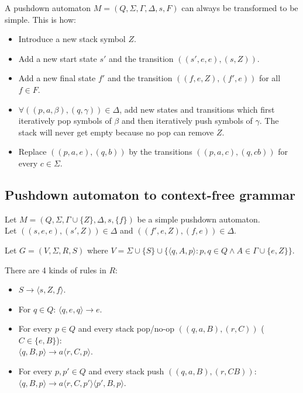 A pushdown automaton $M = (Q, \Sigma, \Gamma, \Delta, s, F)$
can always be transformed to be simple. This is how:
\begin{itemize}
\item Introduce a new stack symbol $Z$.
\item Add a new start state $s'$ and the transition $((s', e, e), (s, Z))$.
\item Add a new final state $f'$ and the transition $((f, e, Z), (f', e))$ for all $f \in F$.
\item $\forall ((p, a, \beta), (q, \gamma)) \in \Delta$, add new states and transitions which
    first iteratively pop symbols of $\beta$ and then iteratively push symbols of $\gamma$.
    The stack will never get empty because no pop can remove $Z$.
\item Replace $((p, a, e), (q, b))$ by the transitions $((p, a, c), (q, cb))$ for every $c \in \Sigma$.
\end{itemize}

\subsection{Pushdown automaton to context-free grammar}

Let $M = (Q, \Sigma, \Gamma \cup \{Z\}, \Delta, s, \{f\})$ be a simple pushdown automaton.\\
Let $((s,e,e), (s',Z)) \in \Delta$ and $((f',e,Z), (f,e)) \in \Delta$.

Let $G = (V, \Sigma, R, S)$ where
$V = \Sigma \cup \{S\} \cup \{\langle q, A, p \rangle: p, q \in Q \wedge A \in \Gamma \cup \{e, Z\}\}$.

There are 4 kinds of rules in $R$:
\begin{itemize}
\item $S \rightarrow \langle s, Z, f \rangle$.
\item For $q \in Q$: $\langle q, e, q \rangle \rightarrow e$.
\item For every $p \in Q$ and every stack pop/no-op $((q,a,B), (r,C))$ ($C \in \{e, B\}$):\\
$\langle q, B, p \rangle \rightarrow a \langle r, C, p \rangle$.
\item For every $p, p' \in Q$ and every stack push $((q,a,B), (r,CB))$:\\
$\langle q, B, p \rangle \rightarrow a \langle r, C, p' \rangle \langle p', B, p \rangle$.
\end{itemize}

